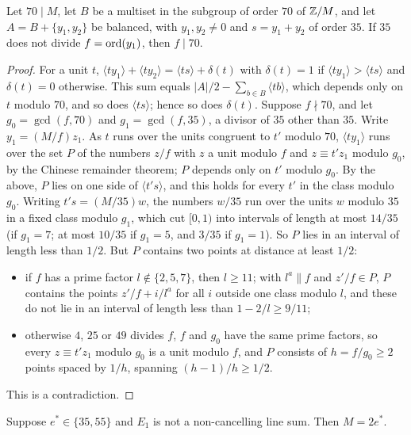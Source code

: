\begin{lemma}[Carry]\label{lem:carry}
Let $70\mid M$, let $B$ be a multiset in the subgroup of order $70$ of
$\mathbb{Z}/M$, and let $A=B+\{y_{1},y_{2}\}$ be balanced, with $y_{1},y_{2}\ne0$
and $s=y_{1}+y_{2}$ of order $35$. If $35$ does not divide $f=\operatorname{ord}(y_{1})$,
then $f\mid70$.
\end{lemma}

\begin{proof}
For a unit $t$,
$\langle ty_{1}\rangle+\langle ty_{2}\rangle=\langle ts\rangle+\delta(t)$
with $\delta(t)=1$ if $\langle ty_{1}\rangle>\langle ts\rangle$ and
$\delta(t)=0$ otherwise. This sum equals $|A|/2-\sum_{b\in B}\langle
tb\rangle$, which depends only on $t$ modulo $70$, and so does $\langle
ts\rangle$; hence so does $\delta(t)$. Suppose $f\nmid70$, and let
$g_{0}=\gcd(f,70)$ and $g_{1}=\gcd(f,35)$, a divisor of $35$ other than $35$.
Write $y_{1}=(M/f)z_{1}$. As $t$ runs over the units congruent to $t'$ modulo
$70$, $\langle ty_{1}\rangle$ runs over the set $P$ of the numbers $z/f$ with
$z$ a unit modulo $f$ and $z\equiv t'z_{1}$ modulo $g_{0}$, by the Chinese
remainder theorem; $P$ depends only on $t'$ modulo $g_{0}$. By the above, $P$
lies on one side of $\langle t's\rangle$, and this holds for every $t'$ in the
class modulo $g_{0}$. Writing $t's=(M/35)w$, the numbers $w/35$ run over the
units $w$ modulo $35$ in a fixed class modulo $g_{1}$, which cut $[0,1)$
into intervals of length at most $14/35$ (if $g_{1}=7$; at most $10/35$ if
$g_{1}=5$, and $3/35$ if $g_{1}=1$). So $P$ lies in an interval of length less
than $1/2$. But $P$ contains two points at distance at least $1/2$:
\begin{itemize}
\item if $f$ has a prime factor $l\notin\{2,5,7\}$, then $l\ge11$; with
$l^{a}\parallel f$ and $z'/f\in P$, $P$ contains the points
$z'/f+i/l^{a}$ for all $i$ outside one class modulo $l$, and these do not lie
in an interval of length less than $1-2/l\ge9/11$;
\item otherwise $4$, $25$ or $49$ divides $f$, $f$ and $g_{0}$ have the same
prime factors, so every $z\equiv t'z_{1}$ modulo $g_{0}$ is a unit modulo $f$,
and $P$ consists of $h=f/g_{0}\ge2$ points spaced by $1/h$, spanning
$(h-1)/h\ge1/2$.
\end{itemize}
This is a contradiction.
\end{proof}

\begin{proposition}\label{prop:3555}
Suppose $e^{*}\in\{35,55\}$ and $E_{1}$ is not a non-cancelling line sum.
Then $M=2e^{*}$.
\end{proposition}

